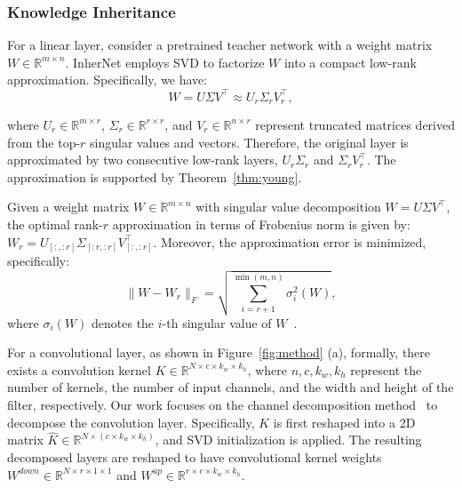 \documentclass{article} %
\begin{document}
\subsubsection{Knowledge Inheritance}

For a linear layer, consider a pretrained teacher network with a weight matrix \( W \in \mathbb{R}^{m\times n} \). InherNet employs SVD to factorize \( W \) into a compact low-rank approximation. Specifically, we have:
\begin{equation}
W = U \Sigma V^\top \approx U_r \Sigma_r V_r^\top,\label{eq:svd}
\end{equation}

where \( U_r \in \mathbb{R}^{m\times r} \), \(\Sigma_r \in \mathbb{R}^{r\times r}\), and \( V_r \in \mathbb{R}^{n\times r} \) represent truncated matrices derived from the top-\( r \) singular values and vectors. Therefore, the original layer is approximated by two consecutive low-rank layers, $U_r\Sigma_r$ and $\Sigma_r V_r^\top$. The approximation is supported by Theorem~\ref{thm:young}.

\begin{theorem}\label{thm:young}
Given a weight matrix \( W \in \mathbb{R}^{m \times n} \) with singular value decomposition \( W = U \Sigma V^\top \), the optimal rank-\( r \) approximation in terms of Frobenius norm is given by: \(W_r = U_{[:, :r]} \Sigma_{[:r, :r]} V_{[:, :r]}^\top\). Moreover, the approximation error is minimized, specifically:
\begin{equation}
\|W - W_r\|_F = \sqrt{\sum_{i=r+1}^{\min(m,n)}\sigma_i^2(W)},
\end{equation}
where \(\sigma_i(W)\) denotes the \(i\)-th singular value of \(W\)~\citep{golub1987generalization,eckart1936approximation,golub2013matrix}.
\end{theorem}

For a convolutional layer, as shown in Figure~\ref{fig:method} (a), formally, there exists a convolution kernel $K \in \mathbb{R}^{N \times c \times k_w \times k_h}$, where $n, c, k_w, k_h$ represent the number of kernels, the number of input channels, and the width and height of the filter, respectively. Our work focuses on the channel decomposition method~\citep{zhang2015accelerating} to decompose the convolution layer. Specifically, $K$ is first reshaped into a 2D matrix $\hat{K} \in \mathbb{R}^{N \times (c \times k_w \times k_h)}$, and SVD initialization is applied. The resulting decomposed layers are reshaped to have convolutional kernel weights $W^{down} \in \mathbb{R}^{N \times r \times 1 \times 1}$ and $W^{up} \in \mathbb{R}^{r \times c \times k_w \times k_h}$.
\end{document}
